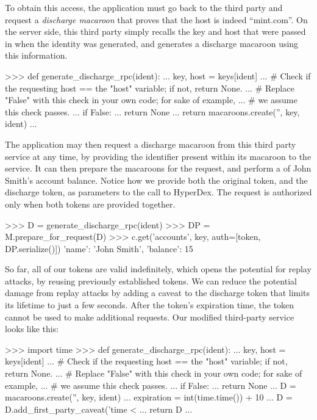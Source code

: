 To obtain this access, the application must go back to the third party and
request a {\em discharge macaroon} that proves that the host is indeed
``mint.com''.  On the server side, this third party simply recalls the key and
host that were passed in when the identity was generated, and generates a
discharge macaroon using this information.

\begin{pythoncode}
>>> def generate_discharge_rpc(ident):
...     key, host = keys[ident]
...     # Check if the requesting host == the "host" variable; if not, return None.
...     # Replace "False" with this check in your own code; for sake of example,
...     # we assume this check passes.
...     if False:
...         return None
...     return macaroons.create('', key, ident)
...
\end{pythoncode}

The application may then request a discharge macaroon from this third party
service at any time, by providing the identifier present within its macaroon to
the service.  It can then prepare the macaroons for the request, and perform a
 of John Smith's account balance.  Notice how we provide both the
original token, and the discharge token, as parameters to the call to HyperDex.
The request is authorized only when both tokens are provided together.

\begin{pythoncode}
>>> D = generate_discharge_rpc(ident)
>>> DP = M.prepare_for_request(D)
>>> c.get('accounts', key, auth=[token, DP.serialize()])
{'name': 'John Smith', 'balance': 15}
\end{pythoncode}

So far, all of our tokens are valid indefinitely, which opens the potential for
replay attacks, by reusing previously established tokens.  We can reduce the
potential damage from replay attacks by adding a caveat to the discharge token
that limits its lifetime to just a few seconds.  After the token's expiration
time, the token cannot be used to make additional requests.  Our modified
third-party service looks like this:

\begin{pythoncode}
>>> import time
>>> def generate_discharge_rpc(ident):
...     key, host = keys[ident]
...     # Check if the requesting host == the "host" variable; if not, return None.
...     # Replace "False" with this check in your own code; for sake of example,
...     # we assume this check passes.
...     if False:
...         return None
...     D = macaroons.create('', key, ident)
...     expiration = int(time.time()) + 10
...     D = D.add_first_party_caveat('time < %
...     return D
...
\end{pythoncode}


